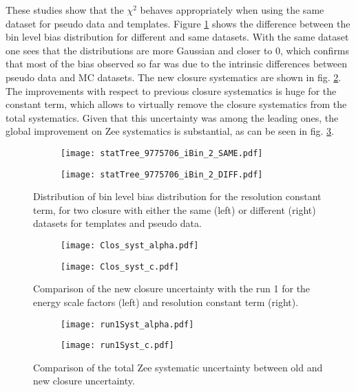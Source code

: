 \begin{enumerate}
These studies show that the $\chi^2$ behaves appropriately when using the same dataset for pseudo data and templates.
Figure \ref{org1646922} shows the difference between the bin level bias distribution for different and same datasets.
With the same dataset one sees that the distributions are more Gaussian and closer to 0, which confirms that most of the bias observed so far was due to the intrinsic differences between pseudo data and MC datasets.
The new closure systematics are shown in fig. \ref{org4b7a948}.
The improvements with respect to previous closure systematics is huge for the constant term, which allows to virtually remove the closure systematics from the total systematics.
Given that this uncertainty was among the leading ones, the global improvement on Zee systematics is substantial, as can be seen in fig. \ref{org628a64a}.




\begin{figure}
\begin{subfigure}[t]{0.49\linewidth}
\texttt{[image: statTree\_9775706\_iBin\_2\_SAME.pdf]}
\end{subfigure}
\begin{subfigure}[t]{0.49\linewidth}
\texttt{[image: statTree\_9775706\_iBin\_2\_DIFF.pdf]}
\end{subfigure}
\caption{\label{org1646922}
Distribution of bin level bias distribution for the resolution constant term, for two closure with either the same (left) or different (right) datasets for templates and pseudo data.}
\end{figure}

\begin{figure}
\begin{subfigure}[t]{0.49\linewidth}
\texttt{[image: Clos\_syst\_alpha.pdf]}
\end{subfigure}
\begin{subfigure}[t]{0.49\linewidth}
\texttt{[image: Clos\_syst\_c.pdf]}
\end{subfigure}
\caption{\label{org4b7a948}
Comparison of the new closure uncertainty with the run 1 for the energy scale factors (left) and resolution constant term (right). \cite{170712_Guerguichon}}
\end{figure}



\begin{figure}
\begin{subfigure}[t]{0.49\linewidth}
\begin{center}
\texttt{[image: run1Syst\_alpha.pdf]}
\end{center}
\end{subfigure}
\begin{subfigure}[t]{0.49\linewidth}
\begin{center}
\texttt{[image: run1Syst\_c.pdf]}
\end{center}
\end{subfigure}
\caption{\label{org628a64a}
Comparison of the total Zee systematic uncertainty between old and new closure uncertainty. \cite{170712_Guerguichon}}
\end{figure}

\end{enumerate}
